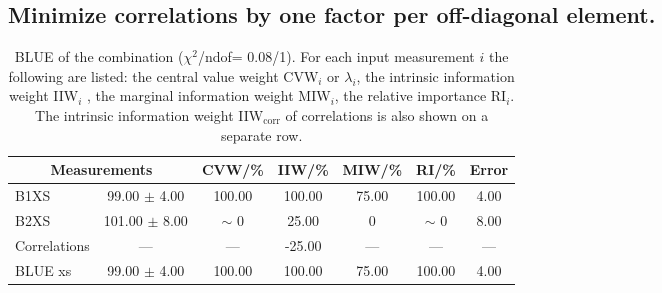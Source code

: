 \subsection{Minimize correlations by one factor per off-diagonal element.}
\begin{table}[H]
\scriptsize
\begin{center}
\renewcommand{\arraystretch}{1.1}
\begin{tabular}{|lc|c|c|c|c|c|}
\hline
\multicolumn{2}{|c|}{Measurements} & CVW/\%  & IIW/\%  & MIW/\%  & RI/\%  & {\tiny Error}\\
\hline
B1XS &      99.00 $\pm$       4.00 &     100.00 &     100.00 &      75.00 &     100.00 &       4.00\\
B2XS &     101.00 $\pm$       8.00 &  {\tiny $\sim$ }0 &      25.00 &  0 &  {\tiny $\sim$ }0 &       8.00\\
Correlations & --- & --- &     -25.00 & --- & --- & ---\\
\hline
BLUE {\tiny xs} &      99.00 $\pm$       4.00 &     100.00 &     100.00 &      75.00 &     100.00 &       4.00\\
\hline
\end{tabular}
\caption{BLUE of the combination ($\chi^2$/ndof=      0.08/1).
 For each input measurement $i$ the following are listed: the central value weight CVW$_i$ or $\lambda_i$, the intrinsic information weight IIW$_i$ , the marginal information weight MIW$_i$, the relative importance RI$_i$. The intrinsic information weight IIW$_{\mathrm{corr}}$ of correlations is also shown on a separate row.}
\renewcommand{\arraystretch}{1}
\end{center}
\end{table}
